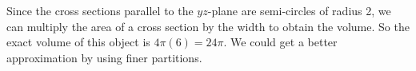 \begin{activitySolution}
    \item Since the cross sections parallel to the $yz$-plane are semi-circles of radius 2, we can multiply the area of a cross section by the width to obtain the volume. So the exact volume of this object is $4 \pi (6) = 24 \pi$. We could get a better approximation by using finer partitions.  


    \ea
\end{activitySolution}
\aftera
